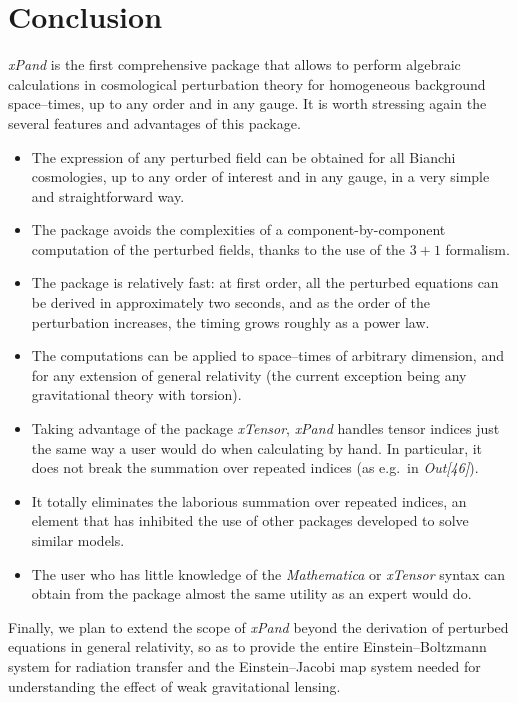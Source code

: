 \documentclass[notitlepage,onecolumn,floatfix,preprintnumbers,aps,prd,showpacs,nofootinbib,amsmath,amssymb,amsfonts]{revtex4-1}
\newcommand{\<}{\langle}
\renewcommand{\>}{\rangle}
\begin{document}
\section*{Conclusion} \label{sec:conclusion}

\textit{xPand} is the first comprehensive package that allows to perform algebraic calculations in cosmological 
perturbation theory for homogeneous background space--times, up to any
order and in any gauge. 
It is worth stressing again the several features and advantages of this package. 

\begin{itemize}
	\item The expression of any perturbed field can be obtained
          for all Bianchi cosmologies, up to any order of interest and in any gauge, in a very simple and straightforward way. 
	\item The package avoids the complexities of a component-by-component computation of the perturbed 
		fields, thanks to the use of the $3+1$ formalism. 
	\item The package is relatively fast: at first order, all the perturbed equations can be derived in approximately 
		two seconds, and as the order of the perturbation increases, the timing grows roughly as a power law. 
	\item The computations can be applied to space--times of arbitrary dimension, and for any extension of general relativity
		(the current exception being any gravitational theory with torsion). 
	\item Taking advantage of the package \textit{xTensor}, \textit{xPand} handles tensor indices just the same 
		way a user would do when calculating by hand. In particular, it does not break the summation over 
		repeated indices (as e.g.\ in \textit{Out[46]}). 
	\item It totally eliminates the laborious summation over repeated indices, an element that has inhibited the 
		use of other packages developed to solve similar models. 
	\item The user who has little knowledge of the \textit{Mathematica} or \textit{xTensor} syntax can obtain 
		from the package almost the same utility as an expert would do.
\end{itemize}

Finally, we plan to extend the scope of \textit{xPand} beyond the derivation of perturbed equations in general relativity, 
so as to provide the entire Einstein--Boltzmann system for radiation transfer and the Einstein--Jacobi map system needed 
for understanding the effect of weak gravitational lensing. 
\end{document}
